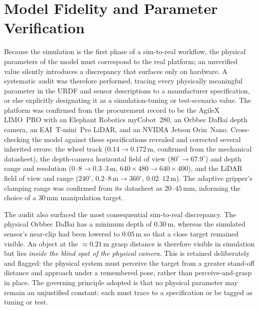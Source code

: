 \section{Model Fidelity and Parameter Verification}
Because the simulation is the first phase of a sim-to-real workflow, the physical
parameters of the model must correspond to the real platform; an unverified value
silently introduces a discrepancy that surfaces only on hardware. A systematic audit was
therefore performed, tracing every physically meaningful parameter in the URDF and
sensor descriptions to a manufacturer specification, or else explicitly designating it
as a simulation-tuning or test-scenario value. The platform was confirmed from the
procurement record to be the AgileX LIMO~PRO with an Elephant Robotics myCobot~280, an
Orbbec DaBai depth camera, an EAI~T-mini~Pro LiDAR, and an NVIDIA Jetson Orin~Nano.
Cross-checking the model against these specifications revealed and corrected several
inherited errors: the wheel track ($0.14\rightarrow0.172$\,m, confirmed from the
mechanical datasheet), the depth-camera
horizontal field of view ($80^{\circ}\rightarrow67.9^{\circ}$) and depth range and
resolution ($0\text{--}8\rightarrow0.3\text{--}3$\,m, $640\times480\rightarrow640\times400$),
and the LiDAR field of view and range
($240^{\circ},\,0.2\text{--}8\,\text{m}\rightarrow360^{\circ},\,0.02\text{--}12\,\text{m}$).
The adaptive gripper's clamping range was confirmed from its datasheet as $20\text{--}45$\,mm,
informing the choice of a $30$\,mm manipulation target.

The audit also surfaced the most consequential sim-to-real discrepancy. The physical
Orbbec DaBai has a minimum depth of $0.30$\,m, whereas the simulated sensor's near-clip
had been lowered to $0.05$\,m so that a close target remained visible. An object at the
$\approx0.21$\,m grasp distance is therefore visible in simulation but lies
\emph{inside the blind spot of the physical camera}. This is retained deliberately and
flagged: the physical system must perceive the target from a greater stand-off distance
and approach under a remembered pose, rather than perceive-and-grasp in place. The
governing principle adopted is that no physical parameter may remain an unjustified
constant: each must trace to a specification or be tagged as tuning or test.

